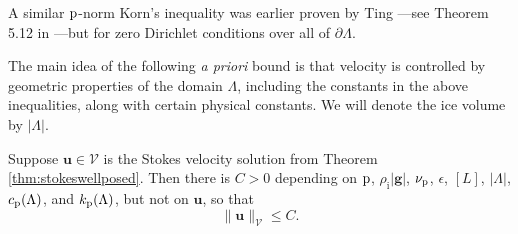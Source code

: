 \documentclass[hidelinks,onefignum,onetabnum,final]{siamart220329}  %
\newcommand{\eps}{\epsilon}
\newcommand{\bg}{\mathbf{g}}
\newcommand{\bu}{\mathbf{u}}
\newcommand{\cV}{\mathcal{V}}
\newcommand{\pp}{{\text{\textnormal{p}}}}
\newcommand{\rhoi}{\rho_{\text{i}}}
\begin{document}
A similar $\pp$-norm Korn's inequality was earlier proven by Ting \cite{Ting1972}---see Theorem 5.12 in \cite{KikuchiOden1988}---but for zero Dirichlet conditions over all of $\partial \Lambda$.

The main idea of the following \emph{a priori}  bound is that velocity is controlled by geometric properties of the domain $\Lambda$, including the constants in the above inequalities, along with certain physical constants.  We will denote the ice volume by $|\Lambda|$.

\begin{lemma} \label{lem:stokesapriori}
Suppose $\bu\in\cV$ is the Stokes velocity solution from Theorem \ref{thm:stokeswellposed}.  Then there is $C>0$ depending on $\pp$, $\rhoi |\bg|$, $\nu_\pp$, $\eps$, $[L]$, $|\Lambda|$, $c_\pp(\Lambda)$, and $k_\pp(\Lambda)$, but not on $\bu$, so that
\begin{equation}
\|\bu\|_{\cV} \le C. \label{eq:stokesapriori}
\end{equation}
\end{lemma}
\end{document}
